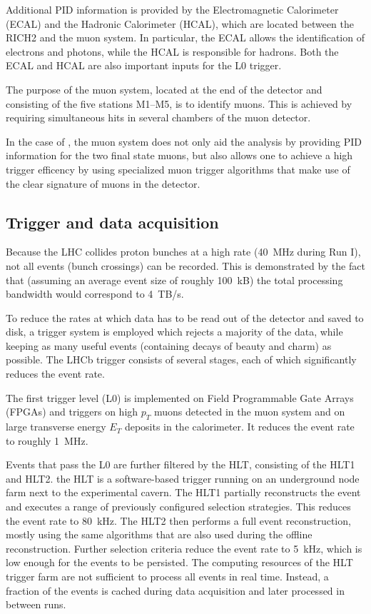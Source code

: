 Additional PID information is provided by the Electromagnetic Calorimeter (ECAL) and the Hadronic Calorimeter (HCAL), which are located between the RICH2 and the muon system.
In particular, the ECAL allows the identification of electrons and photons, while the HCAL is responsible for hadrons.
Both the ECAL and HCAL are also important inputs for the L0 trigger.

The purpose of the muon system, located at the end of the detector and consisting of the five stations M1--M5, is to identify muons.
This is achieved by requiring simultaneous hits in several chambers of the muon detector.

In the case of \decay, the muon system does not only aid the analysis by providing \gls{PID} information for the two final state muons, but also allows one to achieve a high trigger efficency by using specialized muon trigger algorithms that make use of the clear signature of muons in the detector.

\subsection{Trigger and data acquisition}

Because the LHC collides proton bunches at a high rate (\SI{40}{MHz} during Run I), not all events (bunch crossings) can be recorded.
This is demonstrated by the fact that (assuming an average event size of roughly \SI{100}{kB}) the total processing bandwidth would correspond to \SI{4}{TB/s}.

To reduce the rates at which data has to be read out of the detector and saved to disk, a trigger system is employed which rejects a majority of the data, while keeping as many useful events (containing decays of beauty and charm) as possible.
The LHCb trigger consists of several stages, each of which significantly reduces the event rate.

The first trigger level (L0) is implemented on Field Programmable Gate Arrays (FPGAs) and triggers on high $p_T$ muons detected in the muon system and on large transverse energy $E_T$ deposits in the calorimeter.
It reduces the event rate to roughly \SI{1}{MHz}.

Events that pass the L0 are further filtered by the \gls{HLT}, consisting of the HLT1 and HLT2.
the \gls{HLT} is a software-based trigger running on an underground node farm next to the experimental cavern.
The HLT1 partially reconstructs the event and executes a range of previously configured selection strategies.
This reduces the event rate to \SI{80}{kHz}.
The HLT2 then performs a full event reconstruction, mostly using the same algorithms that are also used during the offline reconstruction.
Further selection criteria reduce the event rate to \SI{5}{kHz}, which is low enough for the events to be persisted.  \cite{Trigger2011} \cite{Trigger2012}
The computing resources of the HLT trigger farm are not sufficient to process all events in real time.
Instead, a fraction of the events is cached during data acquisition and later processed in between runs.

